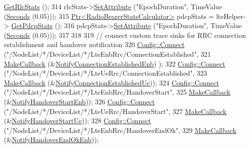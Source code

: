 \begin{DoxyCode}
      \hyperlink{classns3_1_1LteHelper_a6eb438ccf69642e3863adea4991fa2ca}{GetRlcStats} ();
314   rlcStats->\hyperlink{classns3_1_1ObjectBase_ac60245d3ea4123bbc9b1d391f1f6592f}{SetAttribute} (\textcolor{stringliteral}{"EpochDuration"}, TimeValue (\hyperlink{group__timecivil_ga33c34b816f8ff6628e33d5c8e9713b9e}{Seconds} (0.05)));
315   \hyperlink{classns3_1_1Ptr}{Ptr<RadioBearerStatsCalculator>} pdcpStats = lteHelper->
      \hyperlink{classns3_1_1LteHelper_a1017c1f2ee9f5a640c50c25161a57758}{GetPdcpStats} ();
316   pdcpStats->\hyperlink{classns3_1_1ObjectBase_ac60245d3ea4123bbc9b1d391f1f6592f}{SetAttribute} (\textcolor{stringliteral}{"EpochDuration"}, TimeValue (\hyperlink{group__timecivil_ga33c34b816f8ff6628e33d5c8e9713b9e}{Seconds} (0.05)));
317 
318 
319   \textcolor{comment}{// connect custom trace sinks for RRC connection establishment and handover notification}
320   \hyperlink{group__config_ga4014f151241cd0939b6cb64409605736}{Config::Connect} (\textcolor{stringliteral}{"/NodeList/*/DeviceList/*/LteEnbRrc/ConnectionEstablished"},
321                    \hyperlink{group__makecallbackmemptr_ga9376283685aa99d204048d6a4b7610a4}{MakeCallback} (&\hyperlink{lena-x2-handover_8cc_a9ebcea277a72efa6dbfd310068addf75}{NotifyConnectionEstablishedEnb})
      );
322   \hyperlink{group__config_ga4014f151241cd0939b6cb64409605736}{Config::Connect} (\textcolor{stringliteral}{"/NodeList/*/DeviceList/*/LteUeRrc/ConnectionEstablished"},
323                    \hyperlink{group__makecallbackmemptr_ga9376283685aa99d204048d6a4b7610a4}{MakeCallback} (&\hyperlink{lena-x2-handover_8cc_a7b068dcdfdae75954b1d6a533108413e}{NotifyConnectionEstablishedUe}));
324   \hyperlink{group__config_ga4014f151241cd0939b6cb64409605736}{Config::Connect} (\textcolor{stringliteral}{"/NodeList/*/DeviceList/*/LteEnbRrc/HandoverStart"},
325                    \hyperlink{group__makecallbackmemptr_ga9376283685aa99d204048d6a4b7610a4}{MakeCallback} (&\hyperlink{lena-x2-handover_8cc_a98a48f4218409f1681fc99d3d070d8ee}{NotifyHandoverStartEnb}));
326   \hyperlink{group__config_ga4014f151241cd0939b6cb64409605736}{Config::Connect} (\textcolor{stringliteral}{"/NodeList/*/DeviceList/*/LteUeRrc/HandoverStart"},
327                    \hyperlink{group__makecallbackmemptr_ga9376283685aa99d204048d6a4b7610a4}{MakeCallback} (&\hyperlink{lena-x2-handover_8cc_a86f5a4f1ce25b40b625682a16b714f03}{NotifyHandoverStartUe}));
328   \hyperlink{group__config_ga4014f151241cd0939b6cb64409605736}{Config::Connect} (\textcolor{stringliteral}{"/NodeList/*/DeviceList/*/LteEnbRrc/HandoverEndOk"},
329                    \hyperlink{group__makecallbackmemptr_ga9376283685aa99d204048d6a4b7610a4}{MakeCallback} (&\hyperlink{lena-x2-handover_8cc_aef8eb0154877f4690ac5062d7875d5f1}{NotifyHandoverEndOkEnb}));

\end{DoxyCode}
